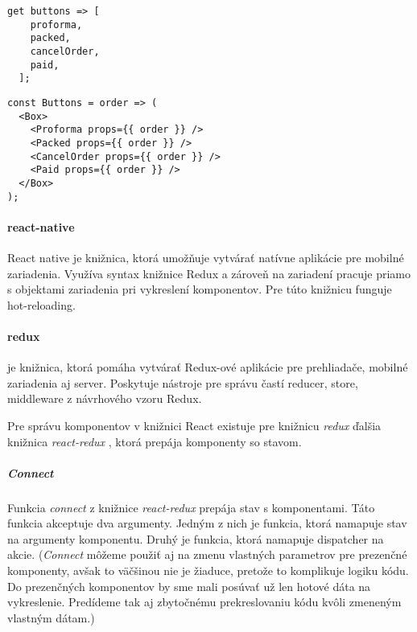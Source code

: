 \begin{lstlisting}[caption=Pole komponentov v Dart-e]
  get buttons => [
    proforma,
    packed,
    cancelOrder,
    paid,
  ];
\end{lstlisting}

\begin{lstlisting}[caption=Pole komponentov v JavaScript-e s použitím knižnice React]
const Buttons = order => (
  <Box>
    <Proforma props={{ order }} />
    <Packed props={{ order }} />
    <CancelOrder props={{ order }} />
    <Paid props={{ order }} />
  </Box>
);
\end{lstlisting}

\paragraph{react-native}
React native \cite{ReactNative} je knižnica, ktorá umožňuje vytvárať natívne aplikácie pre mobilné zariadenia. Využíva syntax knižnice Redux a zároveň na zariadení pracuje priamo s objektami zariadenia pri vykreslení komponentov. Pre túto knižnicu funguje hot-reloading.

\paragraph{redux}
\cite[Redux]{redux-lib} je knižnica, ktorá pomáha vytvárať Redux-ové aplikácie pre prehliadače, mobilné zariadenia aj server. Poskytuje nástroje pre správu častí reducer, store, middleware z návrhového vzoru Redux. 

Pre správu komponentov v knižnici React existuje pre knižnicu \emph{redux} ďalšia knižnica \emph{react-redux} \cite{react-redux}, ktorá prepája komponenty so stavom.

\subparagraph{Connect}
\label{func:connect}
Funkcia \emph{connect} z knižnice \emph{react-redux} \cite{react-redux} prepája stav s komponentami. Táto funkcia akceptuje dva argumenty. Jedným z nich je funkcia, ktorá namapuje stav na argumenty komponentu. Druhý je funkcia, ktorá namapuje dispatcher na akcie. %
(\emph{Connect} môžeme použiť aj na zmenu vlastných parametrov pre prezenčné komponenty, avšak to väčšinou nie je žiaduce, pretože to komplikuje logiku kódu. Do prezenčných komponentov by sme mali posúvať už len hotové dáta na vykreslenie. Predídeme tak aj zbytočnému prekreslovaniu kódu kvôli zmeneným vlastným dátam.)




